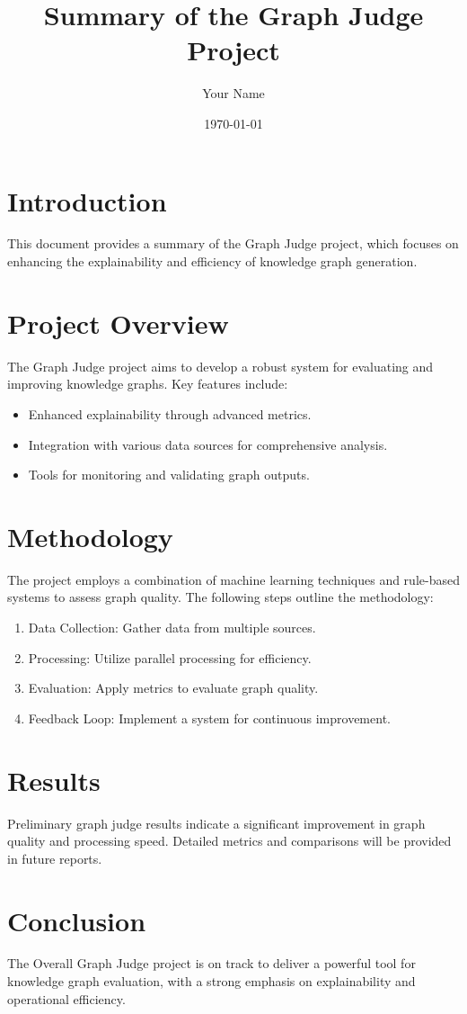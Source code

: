\documentclass{article}
\title{Summary of the Graph Judge Project}
\author{Your Name}
\date{\today}
\begin{document}
\maketitle

\section{Introduction}
This document provides a summary of the Graph Judge project, which focuses on enhancing the explainability and efficiency of knowledge graph generation.

\section{Project Overview}
The Graph Judge project aims to develop a robust system for evaluating and improving knowledge graphs. Key features include:

\begin{itemize}
    \item Enhanced explainability through advanced metrics.
    \item Integration with various data sources for comprehensive analysis.
    \item Tools for monitoring and validating graph outputs.
\end{itemize}

\section{Methodology}
The project employs a combination of machine learning techniques and rule-based systems to assess graph quality. The following steps outline the methodology:

\begin{enumerate}
    \item Data Collection: Gather data from multiple sources.
    \item Processing: Utilize parallel processing for efficiency.
    \item Evaluation: Apply metrics to evaluate graph quality.
    \item Feedback Loop: Implement a system for continuous improvement.
\end{enumerate}

\section{Results}
Preliminary graph judge results indicate a significant improvement in graph quality and processing speed. Detailed metrics and comparisons will be provided in future reports.

\section{Conclusion}
The Overall Graph Judge project is on track to deliver a powerful tool for knowledge graph evaluation, with a strong emphasis on explainability and operational efficiency.
\end{document}
